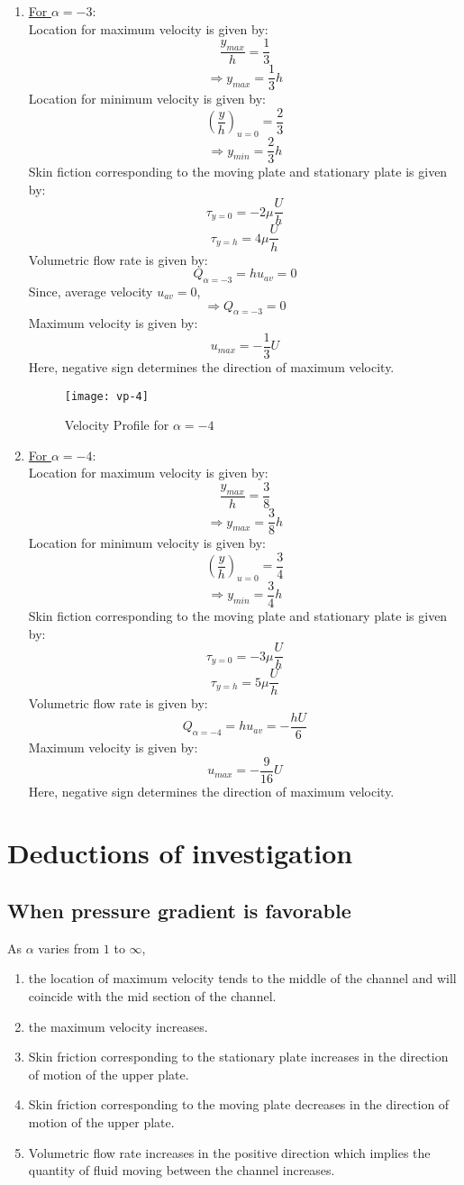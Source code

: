 \documentclass[14pt,one side, a4paper]{extbook}
\begin{document}
\begin{enumerate}
	 		\item {\underline{For $\alpha=-3$}:}
	 		\\Location for maximum velocity is given by:
	 		$$\frac{y_{max}}{h}=\frac{1}{3}$$
	 		$$\Longrightarrow y_{max}=\frac{1}{3}h$$
	 		Location for minimum velocity is given by:
	 		$$\left(\frac{y}{h}\right)_{u=0}=\frac{2}{3}$$
	 		$$\Longrightarrow y_{min}=\frac{2}{3}h$$
	 		Skin fiction corresponding to the moving plate and stationary plate is given by:
	 		$$\tau_{y=0}=-2\mu\frac{U}{h}$$
	 		$$\tau_{y=h}=4\mu\frac{U}{h}$$
	 		Volumetric flow rate is given by:
	 		$$Q_{\alpha=-3}=hu_{av}=0$$
	 		Since, average velocity $u_{av}=0$,
	 		$$\Longrightarrow Q_{\alpha=-3}=0$$
	 		Maximum velocity is given by:
	 		$$u_{max}=-\frac{1}{3}U$$
	 		Here, negative sign determines the direction of maximum velocity.
	 		\begin{figure}[ht]
	 			\centering
	 			\texttt{[image: vp-4]}
	 			\caption{Velocity Profile for $\alpha=-4$}
	 			\label{fig:vp-4}
	 		\end{figure}
	 		
	 		\item {\underline{For $\alpha=-4$}:}
	 		\\Location for maximum velocity is given by:
	 		$$\frac{y_{max}}{h}=\frac{3}{8}$$
	 		$$\Longrightarrow y_{max}=\frac{3}{8}h$$
	 		Location for minimum velocity is given by:
	 		$$\left(\frac{y}{h}\right)_{u=0}=\frac{3}{4}$$
	 		$$\Longrightarrow y_{min}=\frac{3}{4}h$$
	 		Skin fiction corresponding to the moving plate and stationary plate is given by:
	 		$$\tau_{y=0}=-3\mu\frac{U}{h}$$
	 		$$\tau_{y=h}=5\mu\frac{U}{h}$$
	 		Volumetric flow rate is given by:
	 		$$Q_{\alpha=-4}=hu_{av}=-\frac{hU}{6}$$
	 		Maximum velocity is given by:
	 		$$u_{max}=-\frac{9}{16}U$$
	 		Here, negative sign determines the direction of maximum velocity.
	 	\end{enumerate}
	 	\section{Deductions of investigation}
	 	\subsection{When pressure gradient is favorable}
	 	As $\alpha$ varies from $1$ to $\infty$,
	 	\begin{enumerate}
	 		\item {the location of maximum velocity tends to the middle of the channel and will coincide with the mid section of the channel.} 
	 		\item{the maximum velocity increases.} 
	 		\item {Skin friction corresponding to the stationary plate increases in the direction of motion of the upper plate.}
	 		\item{Skin friction corresponding to the moving plate decreases  in the direction of motion of the upper plate.}
	 		\item {Volumetric flow rate increases in the positive direction which implies the quantity of fluid moving between the channel increases.
	 		}
	 	\end{enumerate}
\end{document}
